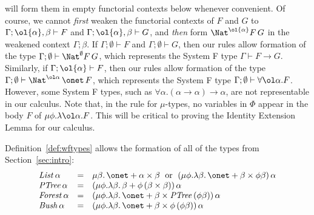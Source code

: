 \documentclass{lmcs}
\theoremstyle{plain}\newtheorem{satz}[thm]{Satz}
\begin{document}
will form them in empty functorial contexts below whenever
convenient. Of course, we cannot {\em first} weaken the functorial
contexts of $F$ and $G$ to $\Gamma; \ol{\alpha}, \beta \vdash F$ and
$\Gamma; \ol{\alpha}, \beta \vdash G$, and {\em then} form
$\Nat^{\ol{\alpha}} F \,G$ in the weakened context $\Gamma; \beta$.
If $\Gamma;\emptyset \vdash F$ and $\Gamma;\emptyset \vdash G$, then
our rules allow formation of the type $\Gamma;\emptyset \vdash
\Nat^\emptyset F \,G$, which represents the System F type $\Gamma
\vdash F \to G$. Similarly, if $\Gamma;\ol{\alpha} \vdash F$, then our
rules allow formation of the type $\Gamma; \emptyset \vdash
\Nat^{\ol\alpha} \,\onet \,F$, which represents the System F type
$\Gamma; \emptyset \vdash \forall \ol\alpha . F$. However, some System
F types, such as $\forall \alpha. (\alpha \to \alpha) \to \alpha$, are
not representable in our calculus. Note that, in the rule for
$\mu$-types, no variables in $\Phi$ appear in the body $F$ of $\mu
\phi. \lambda \ol\alpha.F$. This will be critical to proving the
Identity Extension Lemma for our calculus.

Definition~\ref{def:wftypes} allows the formation of all of the types
from Section~\ref{sec:intro}:
\[\begin{array}{lll}
\mathit{List}\, \alpha & = & \mu \beta. \,\onet + \alpha \times
\beta\; \mbox{ or } \; (\mu \phi. \lambda \beta.\,\onet + \beta \times \phi
\beta)\,\alpha\\ 
\mathit{PTree}\,\alpha & = & (\mu \phi. \lambda \beta.\,\beta +
\phi\,(\beta \times \beta))\,\alpha\\
\mathit{Forest}\,\alpha & = & (\mu \phi. \lambda \beta. \,\onet +
\beta \times \mathit{PTree}\,(\phi \beta))\,\alpha\\ 
\mathit{Bush}\,\alpha & = & (\mu \phi.\lambda \beta. \,\onet + \beta
\times \phi\,(\phi\beta))\,\alpha 
\end{array}\]
           
\end{document}
